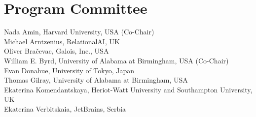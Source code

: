 \documentclass[a4paper]{book}
\begin{document}
\section*{Program Committee}
\noindent
Nada Amin, Harvard University, USA (Co-Chair)\\
Michael Arntzenius, RelationalAI, UK\\
Oliver Bračevac, Galois, Inc., USA\\
William E. Byrd, University of Alabama at Birmingham, USA (Co-Chair)\\
Evan Donahue, University of Tokyo, Japan\\
Thomas Gilray, University of Alabama at Birmingham, USA\\
Ekaterina Komendantskaya, Heriot-Watt University and Southampton University, UK\\
Ekaterina Verbitskaia, JetBrains, Serbia\\

\tableofcontents
\mainmatter
{}



\ \\
\pagebreak






\ \\
\pagebreak



\end{document}
